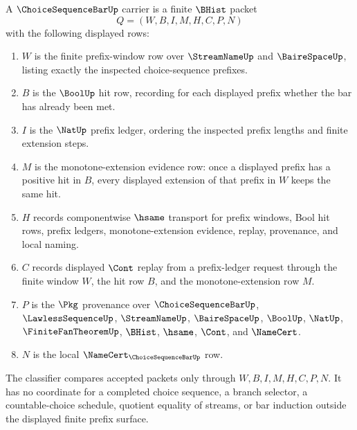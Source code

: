\begin{definition}
\label{def:choice-sequence-bar-carrier}
A $\ChoiceSequenceBarUp$ carrier is a finite $\BHist$ packet
$$
Q=(W,B,I,M,H,C,P,N)
$$
with the following displayed rows:
\begin{enumerate}
\item $W$ is the finite prefix-window row over $\StreamNameUp$ and $\BaireSpaceUp$, listing exactly the inspected choice-sequence prefixes.
\item $B$ is the $\BoolUp$ hit row, recording for each displayed prefix whether the bar has already been met.
\item $I$ is the $\NatUp$ prefix ledger, ordering the inspected prefix lengths and finite extension steps.
\item $M$ is the monotone-extension evidence row: once a displayed prefix has a positive hit in $B$, every displayed extension of that prefix in $W$ keeps the same hit.
\item $H$ records componentwise $\hsame$ transport for prefix windows, Bool hit rows, prefix ledgers, monotone-extension evidence, replay, provenance, and local naming.
\item $C$ records displayed $\Cont$ replay from a prefix-ledger request through the finite window $W$, the hit row $B$, and the monotone-extension row $M$.
\item $P$ is the $\Pkg$ provenance over $\ChoiceSequenceBarUp$, $\LawlessSequenceUp$, $\StreamNameUp$, $\BaireSpaceUp$, $\BoolUp$, $\NatUp$, $\FiniteFanTheoremUp$, $\BHist$, $\hsame$, $\Cont$, and $\NameCert$.
\item $N$ is the local $\NameCert_{\ChoiceSequenceBarUp}$ row.
\end{enumerate}
The classifier compares accepted packets only through $W,B,I,M,H,C,P,N$. It has no coordinate for a completed choice sequence, a branch selector, a countable-choice schedule, quotient equality of streams, or bar induction outside the displayed finite prefix surface.
\end{definition}

